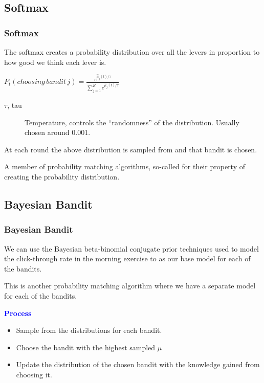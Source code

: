 \documentclass{beamer}
\begin{document}
\subsection{Softmax}
\begin{frame}
  \frametitle{Softmax}
  The softmax creates a probability distribution over all the levers in proportion to how good we think each lever is. \pause

  \begin{center}
    $P_t(choosing\, bandit\, j) = \frac{e^{\hat{\mu}_j(t)/\tau}}{\sum\limits_{j=1}^{K}e^{\hat{\mu}_j(t)/\tau}}$
  \end{center}

  \begin{description}
    \item[$\tau$, tau] Temperature, controls the ``randomness'' of the distribution. Usually chosen around 0.001.
  \end{description} \pause

  At each round the above distribution is sampled from and that bandit is chosen. \vspace{2mm} \pause

  A member of probability matching algorithms, so-called for their property of creating the probability distribution.

\end{frame}

\subsection{Bayesian Bandit}
\begin{frame}
  \frametitle{Bayesian Bandit}
  We can use the Bayesian beta-binomial conjugate prior techniques used to model the click-through rate in the morning exercise to as our base model for each of the bandits. \vspace{2mm}

  This is another probability matching algorithm where we have a separate model for each of the bandits. \vspace{4mm} \pause

  \textbf{\textcolor{blue}{Process}}

  \begin{itemize}
    \item Sample from the distributions for each bandit.
    \item Choose the bandit with the highest sampled $\mu$
    \item Update the distribution of the chosen bandit with the knowledge gained from choosing it.
  \end{itemize}
\end{frame}
\end{document}
